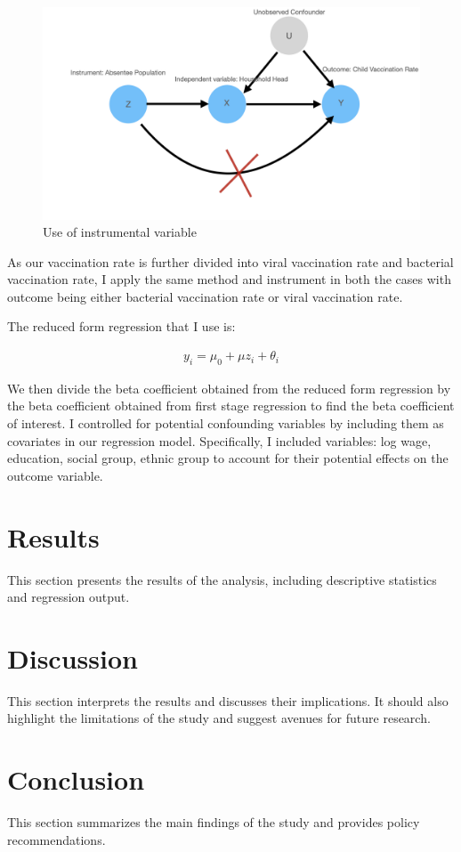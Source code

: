 \documentclass[12pt]{article}
\begin{document}
\begin{figure}[H]
    \centering
    \includegraphics[width=1.0\textwidth]{iv_model.001.jpeg}
    \caption{Use of instrumental variable}
    \label{Table of Summary Statistics}
\end{figure}

As our vaccination rate is further divided into viral vaccination rate and bacterial vaccination rate, I apply the same method and instrument in both the cases with outcome being either bacterial vaccination rate or viral vaccination rate.

The reduced form regression that I use is:

\begin{align}
    y_i = \mu_0 + \mu z_i + \theta_i
\end{align}


We then divide the beta coefficient obtained from the reduced form regression by the beta coefficient obtained from first stage regression to find the beta coefficient of interest. I controlled for potential confounding variables by including them as covariates in our regression model. Specifically, I included variables: log wage, education, social group, ethnic group to account for their potential effects on the outcome variable.

\section{Results}
This section presents the results of the analysis, including descriptive statistics and regression output.

\section{Discussion}
This section interprets the results and discusses their implications. It should also highlight the limitations of the study and suggest avenues for future research.

\section{Conclusion}
This section summarizes the main findings of the study and provides policy recommendations. 



\end{document}
